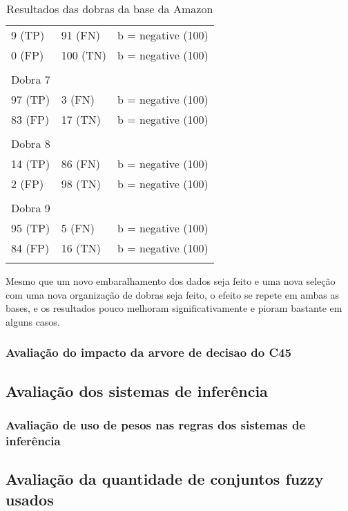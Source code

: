 \begin{table}[!h]
\begin{tabular}{lll}
    9 (TP)    				&91 (FN)      				& b = negative (100) \\
    0 (FP)    				&100 (TN)      				& b = negative (100) \\
	&&\\
	Dobra 7    \\
    97 (TP)    				&3 (FN)      				& b = negative (100) \\
    83 (FP)    				&17 (TN)      				& b = negative (100) \\
	&&\\
	Dobra 8    \\
    14 (TP)    				&86 (FN)      				& b = negative (100) \\
    2 (FP)    				&98 (TN)      				& b = negative (100) \\
	&&\\
	Dobra 9    \\
    95 (TP)    				&5 (FN)      				& b = negative (100) \\
    84 (FP)    				&16 (TN)      				& b = negative (100) \\
	&&\\
    \end{tabular}
    \caption{Resultados das dobras da base da Amazon}
	\label{table:amazon_folds}
\end{table}

Mesmo que um novo embaralhamento dos dados seja feito e uma nova seleção com uma nova organização de dobras seja feito, o efeito se repete em ambas as bases, e os resultados pouco melhoram significativamente e pioram bastante em alguns casos. 

\subsubsection{Avaliação do impacto da arvore de decisao do C45}

\subsection{Avaliação dos sistemas de inferência}

\subsubsection{Avaliação de uso de pesos nas regras dos sistemas de inferência}

\subsection{Avaliação da quantidade de conjuntos fuzzy usados}

